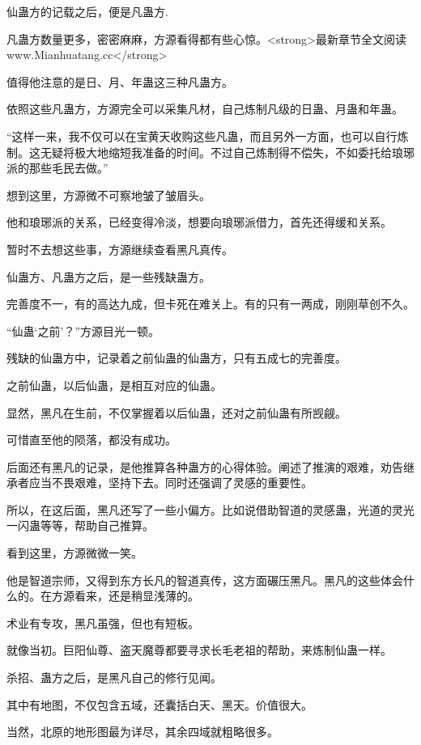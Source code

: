 
\begin{this_body}

仙蛊方的记载之后，便是凡蛊方.

凡蛊方数量更多，密密麻麻，方源看得都有些心惊。<strong>最新章节全文阅读www.Mianhuatang.cc</strong>

值得他注意的是日、月、年蛊这三种凡蛊方。

依照这些凡蛊方，方源完全可以采集凡材，自己炼制凡级的日蛊、月蛊和年蛊。

“这样一来，我不仅可以在宝黄天收购这些凡蛊，而且另外一方面，也可以自行炼制。这无疑将极大地缩短我准备的时间。不过自己炼制得不偿失，不如委托给琅琊派的那些毛民去做。”

想到这里，方源微不可察地皱了皱眉头。

他和琅琊派的关系，已经变得冷淡，想要向琅琊派借力，首先还得缓和关系。

暂时不去想这些事，方源继续查看黑凡真传。

仙蛊方、凡蛊方之后，是一些残缺蛊方。

完善度不一，有的高达九成，但卡死在难关上。有的只有一两成，刚刚草创不久。

“仙蛊‘之前’？”方源目光一顿。

残缺的仙蛊方中，记录着之前仙蛊的仙蛊方，只有五成七的完善度。

之前仙蛊，以后仙蛊，是相互对应的仙蛊。

显然，黑凡在生前，不仅掌握着以后仙蛊，还对之前仙蛊有所觊觎。

可惜直至他的陨落，都没有成功。

后面还有黑凡的记录，是他推算各种蛊方的心得体验。阐述了推演的艰难，劝告继承者应当不畏艰难，坚持下去。同时还强调了灵感的重要性。

所以，在这后面，黑凡还写了一些小偏方。比如说借助智道的灵感蛊，光道的灵光一闪蛊等等，帮助自己推算。

看到这里，方源微微一笑。

他是智道宗师，又得到东方长凡的智道真传，这方面碾压黑凡。黑凡的这些体会什么的。在方源看来，还是稍显浅薄的。

术业有专攻，黑凡虽强，但也有短板。

就像当初。巨阳仙尊、盗天魔尊都要寻求长毛老祖的帮助，来炼制仙蛊一样。

杀招、蛊方之后，是黑凡自己的修行见闻。

其中有地图，不仅包含五域，还囊括白天、黑天。价值很大。

当然，北原的地形图最为详尽，其余四域就粗略很多。


\end{this_body}
